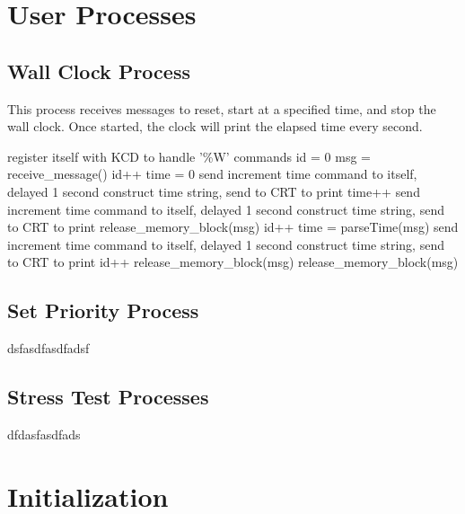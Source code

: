 \documentclass[12pt]{report}
\begin{document}
\section{User Processes}

\subsection{Wall Clock Process}

This process receives messages to reset, start at a specified time, and stop the wall clock. Once started, the clock will print the elapsed time every second.

\begin{algorithmic}[1]
    \State register itself with KCD to handle '\%W' commands
    \State id = 0
      \State msg = receive\_message()
        \State id++
        \State time = 0
        \State send increment time command to itself, delayed 1 second
        \State construct time string, send to CRT to print
          \State time++
          \State send increment time command to itself, delayed 1 second
          \State construct time string, send to CRT to print
        \Else
          \State release\_memory\_block(msg)
        \EndIf
        \State id++
        \State time = parseTime(msg)
        \State send increment time command to itself, delayed 1 second
        \State construct time string, send to CRT to print
        \State id++
        \State release\_memory\_block(msg)
      \Else
        \State release\_memory\_block(msg)
      \EndIf
    \EndWhile
  \EndFunction
\end{algorithmic}

\subsection{Set Priority Process}

dsfasdfasdfadsf

\subsection{Stress Test Processes}

dfdasfasdfads

\section{Initialization}
\end{document}
